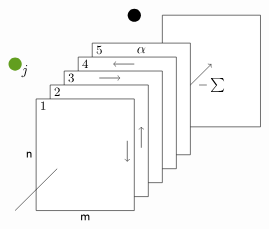 \documentclass[10pt]{article}
\begin{document}
\[\begin{tikzpicture}
%
\node[draw=black,minimum width=7em,minimum height=8em,rectangle,fill=white]  at (9em,6em) {};
\node[draw=black,minimum width=7em,minimum height=8em,rectangle,fill=white]  at (4em,4em) {};
\node[draw=black,minimum width=7em,minimum height=8em,rectangle,fill=white]  at (3em,3em) {};
\node[draw=black,minimum width=7em,minimum height=8em,rectangle,fill=white]  at (2em,2em) {};
\node[draw=black,minimum width=7em,minimum height=8em,rectangle,fill=white]  at (1em,1em) {};
\node[draw=black,minimum width=7em,minimum height=8em,rectangle,fill=white]  at (0,0) {};
%
\node[fill=ngreen,circle]  at (-5em,6.5em) {};
\node[fill=black,circle]  at (3.5em,10em) {};
\node[]  at (-4.3em,6em) {$\small{j}$};
%
\node[]  at (-3em,3.5em) {\small{1}};
\draw[->] (1em,5.5em) -- (2.5em,5.5em);
\node[]  at (-2em,4.5em) {\small{2}};
\draw[<-] (2em,6.5em) -- (3.5em,6.5em);
\node[]  at (-1em,5.5em) {\small{3}};
\draw[<-] (3em,-0.5em) -- (3em,1em);
\node[]  at (0em,6.5em) {\small{4}};
\draw[->] (4em,0.5em) -- (4em,2em);
\node[]  at (1em,7.5em) {\small{5}};
\node[]  at (4em,7.5em) {$\small{\alpha}$};
%
\draw[->] (7.5em,5em) -- (9em,6.5em);
\node[]  at (9em,5em) {\small{$-\sum$}};
\draw[-] (-5em,-4em) -- (-2em,-1em);
%
\node[]  at (-4em,0em) {\small{\sf n}};
\node[]  at (0em,-4.5em) {\small{\sf m}};
\end{tikzpicture}
\]
\end{document}
